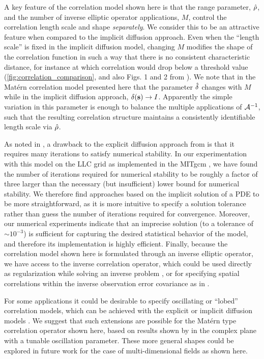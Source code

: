A key feature of the correlation model shown here is that the range parameter,
$\hat{\rho}$, and the number of inverse elliptic operator applications, $M$,
control the correlation length scale and shape \textit{separately}.
We consider this to be an attractive feature when compared to the implicit
diffusion approach.
Even when the ``length scale'' is fixed in the implicit diffusion model, changing $M$
modifies the shape of the correlation function in such a way that there is no
consistent characteristic distance, for instance at which correlation would drop below a
threshold value
(\cref{fig:correlation_comparison}, and also Figs. 1 and 2 from
\citet{guillet_modelling_2019}).
We note that in the Mat\'ern correlation model presented here that the parameter
$\hat{\delta}$ changes with $M$ while in the implicit diffusion approach,
$\delta(\mathbf{s}) \rightarrow I$.
Apparently the simple variation in this parameter is enough to balance the
multiple applications of $\mathcal{A}^{-1}$, such that the resulting correlation
structure maintains a consistently identifiable length scale via $\hat{\rho}$.

As noted in \citet{mirouze_representation_2010,carrier_background-error_2010}, a
drawback to the explicit diffusion approach from
\citet{weaver_correlation_2001} is that it requires many iterations to satisfy
numerical stability.
In our experimentation with this model on the LLC grid
as implemented in the MITgcm \citep{campin_mitgcmmitgcm_2021}, we have found
the number of iterations required for numerical stability to be roughly a factor
of three larger than the necessary (but insufficient) lower bound for numerical
stability.
We therefore find approaches based on the implicit solution of a PDE to be more
straightforward, as it is more intuitive to specify a solution tolerance
rather than guess the number of iterations required for convergence.
Moreover, our numerical experiments indicate that
an imprecise solution (to a tolerance of $\sim10^{-3}$)
is sufficient for capturing the desired statistical behavior of the model,
and therefore its implementation is highly efficient.
Finally, because the correlation model shown here is formulated through an
inverse elliptic operator, we have access to the inverse correlation operator,
which could be used directly as regularization while solving an inverse problem
\citep[e.g.,][]{bui-thanh_computational_2013},
or for specifying spatial correlations within the inverse observation error
covariance as in \citet{guillet_modelling_2019}.

For some applications it could be desirable to specify oscillating or ``lobed''
correlation models, which can be achieved with the explicit or implicit
diffusion models \citep{weaver_correlation_2001,weaver_diffusion_2013}.
We suggest that such extensions are possible for the Mat\'ern type correlation
operator shown here, based on results shown by  in the
complex plane with a tunable oscillation parameter.
These more general shapes could be explored in future work for the case of
multi-dimensional fields as shown here.
